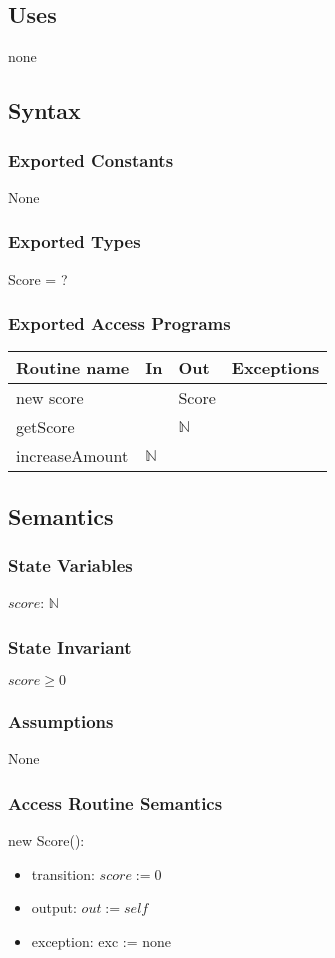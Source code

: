 \documentclass[12pt]{article}
\begin{document}
\subsection*{Uses}
none

\subsection*{Syntax}
\subsubsection*{Exported Constants}
None
\subsubsection*{Exported Types}
Score = ?
\subsubsection*{Exported Access Programs}
\begin{tabular}{| l | l | l | p{5cm} |}
\hline
\textbf{Routine name} & \textbf{In} & \textbf{Out} & \textbf{Exceptions}\\
\hline
new score &  & Score &\\
\hline
getScore &    & $\mathbb{N}$ & \\
\hline
increaseAmount & $\mathbb{N}$ & &\\
\hline
\end{tabular}

\subsection*{Semantics}
\subsubsection*{State Variables}
$\mathit{score}$: $\mathbb{N}$
\subsubsection*{State Invariant}
$score \geq 0$
\subsubsection*{Assumptions}
None
\subsubsection*{Access Routine Semantics}
\noindent new Score():
\begin{itemize}
\item transition: $\mathit{score} := 0$
\item output: $out := \mathit{self}$
\item exception: exc := none
\end{itemize}
\newpage
\end{document}
